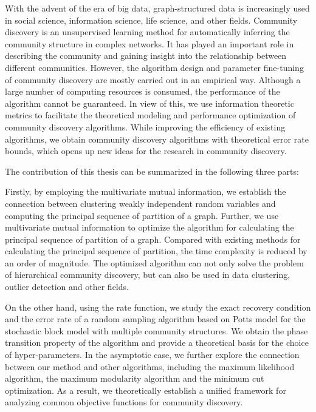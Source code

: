 \begin{abstract*}
  With the advent of the era of big data, graph-structured data is increasingly used in
  social science, information science, life science, and other fields.
  Community discovery is an unsupervised learning method for automatically inferring the community structure
  in complex networks.
  It has played an important role in describing the community and gaining insight into the relationship between different communities.
  However, the algorithm design and parameter fine-tuning of community discovery are mostly carried out in an empirical way.
  Although a large number of computing resources is consumed,
  the performance of the algorithm cannot be guaranteed.
  In view of this,
  we use information theoretic metrics
  to facilitate the theoretical modeling and performance optimization of community discovery algorithms.
  While improving the efficiency of existing algorithms,
  we obtain community discovery algorithms with theoretical error rate bounds,
  which opens up new ideas for the research in community discovery.

  The contribution of this thesis can be summarized in the following three parts:

  Firstly, by employing the multivariate mutual information,
  we establish the connection between clustering weakly independent random variables and computing the principal sequence of partition
  of a graph.
  Further, we use multivariate mutual information to optimize the algorithm for calculating the principal sequence of partition of a graph.
  Compared with existing methods for calculating the principal sequence of partition,
  the time complexity is reduced by an order of magnitude.
  The optimized algorithm can not only solve the problem of hierarchical community discovery, but can also be used in data clustering, outlier detection and other fields.

  On the other hand, using the rate function,
  we study the exact recovery condition and the error rate of a random sampling algorithm based on Potts model
  for the stochastic block model with multiple community structures.
  We obtain the phase transition property of the algorithm and provide a theoretical basis
  for the choice of hyper-parameters.
  In the asymptotic case, we further explore the connection between our method and other algorithms, including the maximum likelihood algorithm, the maximum modularity algorithm and the minimum cut optimization.
  As a result, we theoretically establish a unified framework for analyzing common objective functions for community discovery.


\end{abstract*}
